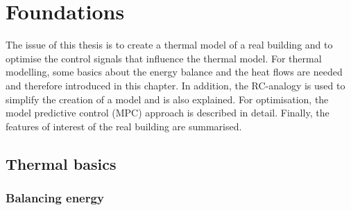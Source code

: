 \chapter{Foundations}
\label{ch:foundations}
The issue of this thesis is to create a thermal model of a real building and to optimise the control signals that influence the thermal model. For thermal modelling, some basics about the energy balance and the heat flows are needed and therefore introduced in this chapter. In addition, the RC-analogy is used to simplify the creation of a model and is also explained. For optimisation, the model predictive control (MPC) approach is described in detail. Finally, the features of interest of the real building are summarised. 

\section{Thermal basics}
\label{section:thermalbasics}

\subsection{Balancing energy}
\label{subsection:balancing energy}

